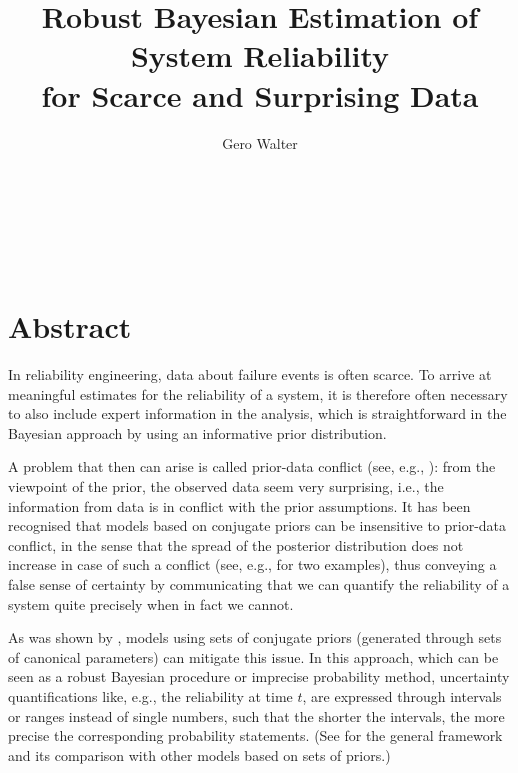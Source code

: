 \documentclass[12pt,a4paper,twocolumn,fleqn]{narmsabs}
\begin{document}
\title{Robust Bayesian Estimation of System Reliability\\ for Scarce and Surprising Data}
\author{{Gero Walter} \\
{} \\
{} \\
\\
{}\\
{} \\
{}}
\maketitle


\section*{Abstract}

In reliability engineering, data about failure events is often scarce.
To arrive at meaningful estimates for the reliability of a system,
it is therefore often necessary to also include expert information in the analysis,
which is straightforward in the Bayesian approach by using an informative prior distribution.

A problem that then can arise is called prior-data conflict (see, e.g., ):
from the viewpoint of the prior, the observed data seem very surprising,
i.e., the information from data is in conflict with the prior assumptions.
It has been recognised that models based on conjugate priors can be insensitive to prior-data conflict,
in the sense that the spread of the posterior distribution does not increase in case of such a conflict
(see, e.g.,  for two examples),
thus conveying a false sense of certainty by communicating that we can quantify the reliability of a system quite precisely
when in fact we cannot.

As was shown by , models using sets of conjugate priors %
(generated through sets of canonical parameters) can mitigate this issue.
In this approach, which can be seen as a robust Bayesian procedure or imprecise probability method,
uncertainty quantifications like, e.g., the reliability at time $t$,
are expressed through intervals or ranges instead of single numbers,
such that the shorter the intervals, the more precise the corresponding probability statements.
(See  for the general framework and its comparison with other models based on sets of priors.)
\end{document}
